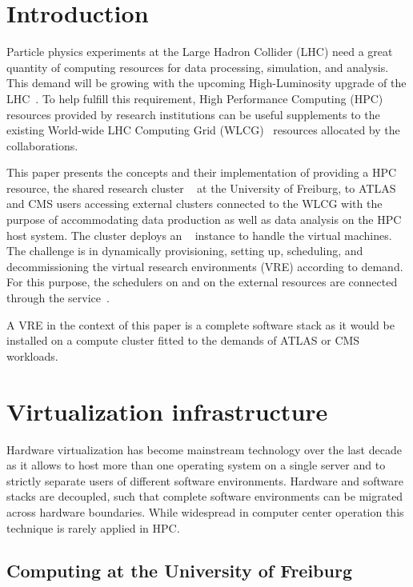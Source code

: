 \section{Introduction}
\label{intro}
Particle physics experiments at the Large Hadron Collider (LHC) need a
great quantity of computing resources for data processing, simulation, and analysis.
This demand will be growing with the upcoming High-Luminosity upgrade of the LHC~\cite{HLLHCcompneeds}.
To help fulfill this requirement, High Performance Computing (HPC) resources provided by research institutions
can be useful supplements to the existing World-wide LHC Computing
Grid (WLCG)~\cite{wlcg} resources
allocated by the collaborations.


This paper presents the concepts and their implementation of providing a HPC resource, the
shared research cluster \NEMO~\cite{nemo} at the University of Freiburg, to ATLAS and CMS users accessing external clusters connected to the WLCG with the purpose of accommodating data production as well as
data analysis on the HPC host system.
The  \NEMO cluster deploys an \Openstack~\cite{Openstack} instance to handle the
virtual machines. The challenge is in dynamically provisioning,
setting up, scheduling, and decommissioning the virtual research environments (VRE)  according to demand. For this purpose, the schedulers on \NEMO and on the external resources are
connected through the \Roced service~\cite{ROCED}.


A VRE in the context of this paper is a complete software stack
as it would be installed on a compute cluster fitted to the demands of ATLAS or CMS workloads.


\section{Virtualization infrastructure}
\label{sec:openstack}

Hardware virtualization has become mainstream technology over the last decade as it allows
to host more than one operating system on a single server and to strictly
separate users of different software environments.
Hardware and software stacks are decoupled, such that complete software
environments can be migrated across hardware boundaries.
While widespread in computer center
operation this technique is rarely applied in HPC.


\subsection{Computing at the University of Freiburg}


